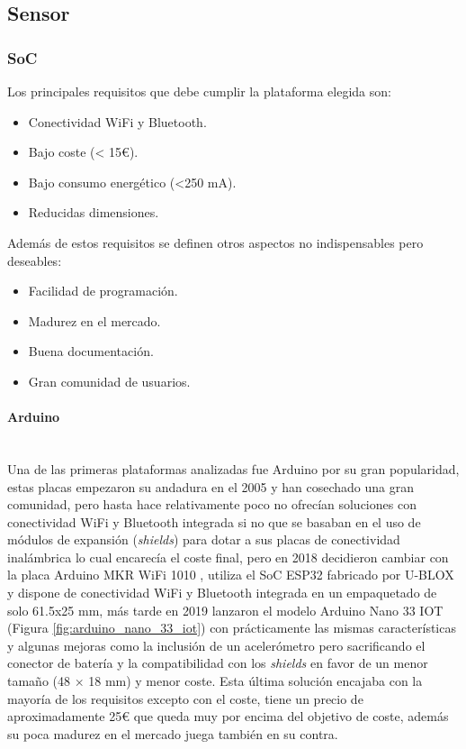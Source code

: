 \documentclass[../proyecto.tex]{subfiles}
\begin{document}
\subsection{Sensor}
\subsubsection{SoC}
Los principales requisitos que debe cumplir la plataforma elegida son:

\begin{itemize}
  \item Conectividad WiFi y Bluetooth.
  \item Bajo coste (< 15€).
  \item Bajo consumo energético (<250 mA).
  \item Reducidas dimensiones.
\end{itemize}

Además de estos requisitos se definen otros aspectos no indispensables pero deseables:

\begin{itemize}
  \item Facilidad de programación.
  \item Madurez en el mercado.
  \item Buena documentación.
  \item Gran comunidad de usuarios.
\end{itemize}

\paragraph{Arduino}\mbox{}\\

Una de las primeras plataformas analizadas fue Arduino por su gran popularidad, estas placas empezaron su andadura en el 2005 y han cosechado una gran comunidad, pero hasta hace relativamente poco no ofrecían soluciones con conectividad WiFi y Bluetooth integrada si no que se basaban en el uso de módulos de expansión (\textit{shields}) para dotar a sus placas de conectividad inalámbrica lo cual encarecía el coste final, pero en 2018 decidieron cambiar con la placa Arduino MKR WiFi 1010 \cite{arduino_mkr_wifi_1010}, utiliza el SoC ESP32 fabricado por U-BLOX y dispone de conectividad WiFi y Bluetooth integrada en un empaquetado de solo 61.5x25 mm, más tarde en 2019 lanzaron el modelo Arduino Nano 33 IOT \cite{arduino_nano_33_iot} (Figura \ref{fig:arduino_nano_33_iot}) con prácticamente las mismas características y algunas mejoras como la inclusión de un acelerómetro pero sacrificando el conector de batería y la compatibilidad con los \textit{shields} en favor de un menor tamaño (48 × 18 mm) y menor coste. Esta última solución encajaba con la mayoría de los requisitos excepto con el coste, tiene un precio de aproximadamente 25€ que queda muy por encima del objetivo de coste, además su poca madurez en el mercado juega también en su contra.
\end{document}
